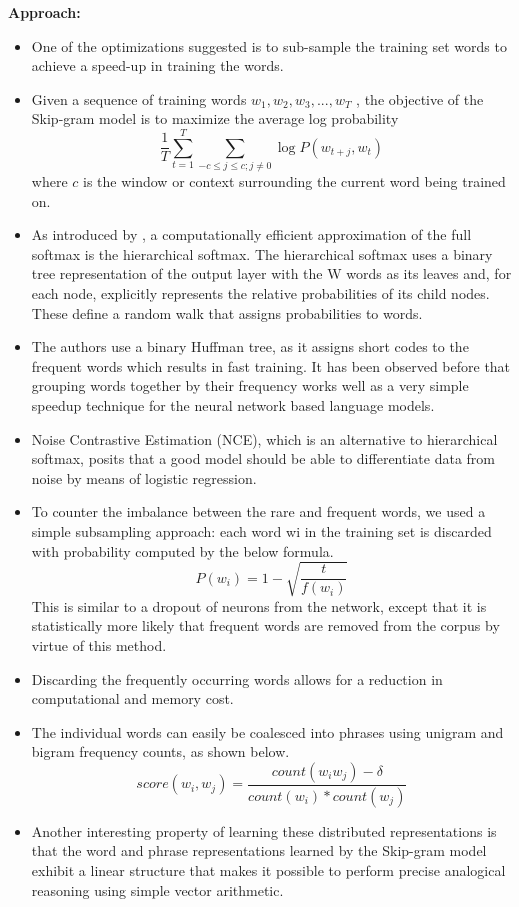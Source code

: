 \documentclass[11pt,a4paper]{article}
\begin{document}
  \textbf{Approach:}
  \begin{itemize}
    \item 
    One of the optimizations suggested is to sub-sample the training set words to achieve a speed-up in training the words.
    \item 
    Given a sequence of training words $w_1 , w_2 , w_3 , . . . , w_T$ , the objective of the Skip-gram model is to maximize the average log probability 
    \begin{equation}
      \frac{1}{T} \sum_{t=1}^T \sum_{-c \leq j \leq c; j \neq 0} \log P(w_{t+j}, w_t)
    \end{equation}
    where $c$ is the window or context surrounding the current word being trained on. 
    \item 
    As introduced by \cite{morin2005hierarchical}, a computationally efficient approximation of the full softmax is the hierarchical softmax. The hierarchical softmax uses a binary tree representation of the output layer with the W words as its leaves and, for each node, explicitly represents the relative probabilities of its child nodes. These define a random walk that assigns probabilities to words.
    \item 
    The authors use a binary Huffman tree, as it assigns short codes to the frequent words which results in fast training. It has been observed before that grouping words together by their frequency works well as a very simple speedup technique for the neural network based language models.
    \item 
    Noise Contrastive Estimation (NCE), which is an alternative to hierarchical softmax,  posits that a good model should be able to differentiate data from noise by means of logistic regression.
    \item 
    To counter the imbalance between the rare and frequent words, we used a simple subsampling approach: each word wi in the training set is discarded with probability computed by the below formula. 
    $$P(w_i) = 1 - \sqrt{\frac{t}{f(w_i)}} $$
    This is similar to a dropout of neurons from the network, except that it is statistically more likely that frequent words are removed from the corpus by virtue of this method.
    \item 
    Discarding the frequently occurring words allows for a reduction in computational and memory cost.
    \item 
    The individual words can easily be coalesced into phrases using unigram and bigram frequency counts, as shown below.
    $$score(w_i, w_j) = \frac{count(w_i w_j) - \delta}{count(w_i) * count(w_j)} $$
    \item 
    Another interesting property of learning these distributed representations is that the word and phrase representations learned by the Skip-gram model exhibit a linear structure that makes it possible to perform precise analogical reasoning using simple vector arithmetic.
  \end{itemize}
\end{document}

